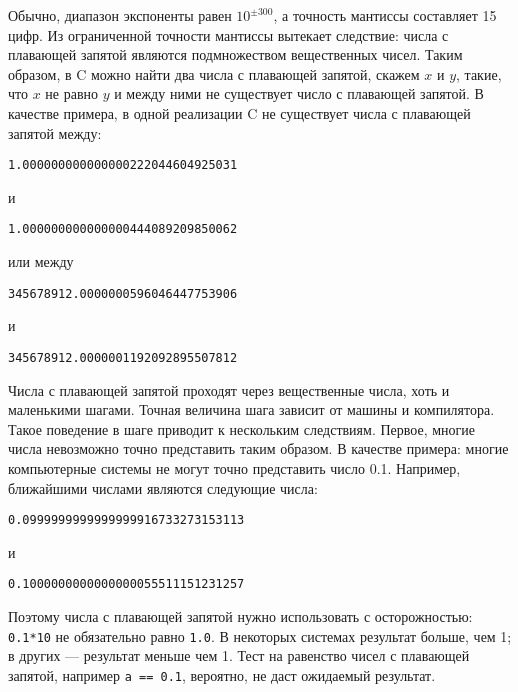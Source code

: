 Обычно, диапазон экспоненты равен $10^{\pm 300}$, а точность мантиссы составляет 15 цифр. Из ограниченной точности мантиссы вытекает следствие: числа с плавающей запятой являются подмножеством вещественных чисел. Таким образом, в C можно найти два числа с плавающей запятой, скажем $x$ и $y$, такие, что $x$ не равно $y$ и между ними не существует число с плавающей запятой. В качестве примера, в одной реализации C не существует числа с плавающей запятой между:

\begin{lstlisting}
1.000000000000000222044604925031
\end{lstlisting}

и

\begin{lstlisting}
1.000000000000000444089209850062
\end{lstlisting}

или между

\begin{lstlisting}
345678912.0000000596046447753906
\end{lstlisting}

и

\begin{lstlisting}
345678912.0000001192092895507812
\end{lstlisting}

Числа с плавающей запятой проходят через вещественные числа, хоть и маленькими шагами. Точная величина шага зависит от машины и компилятора. Такое поведение в шаге приводит к нескольким следствиям. Первое, многие числа невозможно точно представить таким образом. В качестве примера: многие компьютерные системы не могут точно представить число 0.1. Например, ближайшими числами являются следующие числа:

\begin{lstlisting}
0.0999999999999999916733273153113
\end{lstlisting}

и

\begin{lstlisting}
0.1000000000000000055511151231257
\end{lstlisting}

Поэтому числа с плавающей запятой нужно использовать с осторожностью: \lstinline|0.1*10| не обязательно равно \lstinline|1.0|. В некоторых системах результат больше, чем 1; в других --- результат меньше чем 1. Тест на равенство чисел с плавающей запятой, например \lstinline|a == 0.1|, вероятно, не даст ожидаемый результат.

